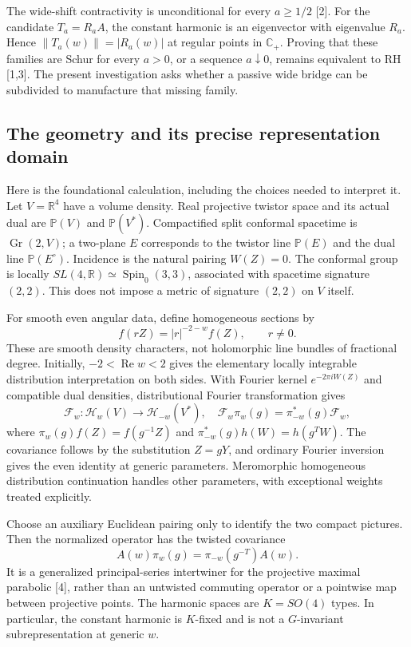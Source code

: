 \documentclass[11pt,letterpaper]{article}
\newcommand{\CP}{\mathbb C_+}
\newcommand{\Rea}{\operatorname{Re}}
\begin{document}
The wide-shift contractivity is unconditional for every $a\geq1/2$ [2]. For the candidate $T_a=R_aA$, the constant harmonic is an eigenvector with eigenvalue $R_a$. Hence $\|T_a(w)\|=|R_a(w)|$ at regular points in $\CP$. Proving that these families are Schur for every $a>0$, or a sequence $a\downarrow0$, remains equivalent to RH [1,3]. The present investigation asks whether a passive wide bridge can be subdivided to manufacture that missing family.

\subsection*{The geometry and its precise representation domain}
Here is the foundational calculation, including the choices needed to interpret it. Let $V=\mathbb R^4$ have a volume density. Real projective twistor space and its actual dual are $\mathbb P(V)$ and $\mathbb P(V^*)$. Compactified split conformal spacetime is $\operatorname{Gr}(2,V)$; a two-plane $E$ corresponds to the twistor line $\mathbb P(E)$ and the dual line $\mathbb P(E^\circ)$. Incidence is the natural pairing $W(Z)=0$. The conformal group is locally $SL(4,\mathbb R)\simeq\operatorname{Spin}_0(3,3)$, associated with spacetime signature $(2,2)$. This does not impose a metric of signature $(2,2)$ on $V$ itself.

For smooth even angular data, define homogeneous sections by
\[
 f(rZ)=|r|^{-2-w}f(Z),\qquad r\ne0.
\]
These are smooth density characters, not holomorphic line bundles of fractional degree. Initially, $-2<\Rea w<2$ gives the elementary locally integrable distribution interpretation on both sides. With Fourier kernel $e^{-2\pi iW(Z)}$ and compatible dual densities, distributional Fourier transformation gives
\[
 \mathcal F_w:\mathcal H_w(V)\longrightarrow\mathcal H_{-w}(V^*),\quad
 \mathcal F_w\pi_w(g)=\pi^*_{-w}(g)\mathcal F_w,
\]
where $\pi_w(g)f(Z)=f(g^{-1}Z)$ and $\pi^*_{-w}(g)h(W)=h(g^TW)$. The covariance follows by the substitution $Z=gY$, and ordinary Fourier inversion gives the even identity at generic parameters. Meromorphic homogeneous distribution continuation handles other parameters, with exceptional weights treated explicitly.

Choose an auxiliary Euclidean pairing only to identify the two compact pictures. Then the normalized operator has the twisted covariance
\[
 A(w)\pi_w(g)=\pi_{-w}(g^{-T})A(w).
\]
It is a generalized principal-series intertwiner for the projective maximal parabolic [4], rather than an untwisted commuting operator or a pointwise map between projective points. The harmonic spaces are $K=SO(4)$ types. In particular, the constant harmonic is $K$-fixed and is not a $G$-invariant subrepresentation at generic $w$.
\end{document}
